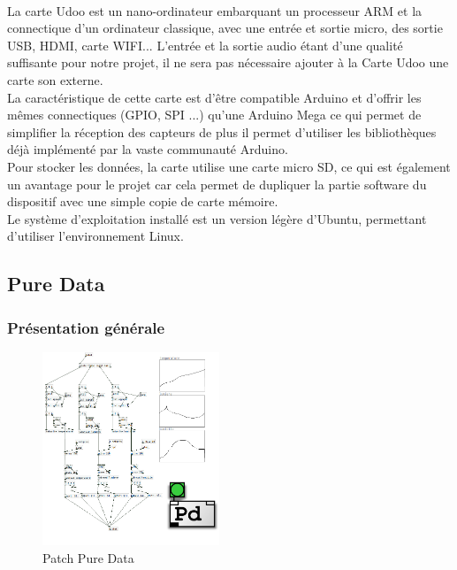 \documentclass[a4paper, titlepage, oneside, 12pt]{article}%
\begin{document}
\paragraph{}
La carte Udoo est un nano-ordinateur embarquant un processeur ARM et la connectique d'un ordinateur classique, avec une entrée et sortie micro, des sortie USB, HDMI, carte WIFI... L'entrée et la sortie audio étant d'une qualité suffisante pour notre projet, il ne sera pas nécessaire ajouter à la Carte Udoo une carte son externe.\\
La caractéristique de cette carte est d’être compatible Arduino et d'offrir les mêmes connectiques (GPIO, SPI ...) qu'une Arduino Mega ce qui permet de simplifier la réception des capteurs de plus il permet d'utiliser les bibliothèques déjà implémenté par la vaste communauté Arduino.\\
Pour stocker les données, la carte utilise une carte micro SD, ce qui est également un avantage pour le projet car cela permet de dupliquer la partie software du dispositif avec une simple copie de carte mémoire.\\
Le système d'exploitation installé est un version légère d'Ubuntu, permettant d'utiliser l’environnement Linux.

\subsection{Pure Data}
\subsubsection{Présentation générale}
\begin{figure}
  \centering
  \includegraphics[width=200px]{pd.jpg}
  \caption{Patch Pure Data}
\end{figure}
\end{document}
